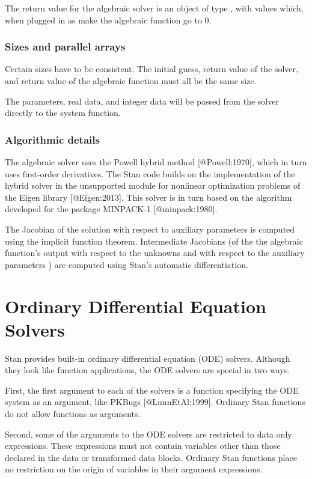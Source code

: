\begin{description}
{\begin{description}
The return value for the algebraic solver is an object of type , with values which, when plugged in as  make the algebraic function go to 0.


\subsubsection{Sizes and parallel arrays}


Certain sizes have to be consistent. The initial guess, return value of the solver, and return value of the algebraic function must all be the same size.


The parameters, real data, and integer data will be passed from the solver directly to the system function.


\subsubsection{Algorithmic details}


The algebraic solver uses the Powell hybrid method [@Powell:1970], which in turn uses first-order derivatives. The Stan code builds on the implementation of the hybrid solver in the unsupported module for nonlinear optimization problems of the Eigen library [@Eigen:2013]. This solver is in turn based on the algorithm developed for the package MINPACK-1 [@minpack:1980].


The Jacobian of the solution with respect to auxiliary parameters is computed using the implicit function theorem. Intermediate Jacobians (of the the algebraic function's output with respect to the unknowns  and with respect to the auxiliary parameters ) are computed using Stan's automatic differentiation.


\section{Ordinary Differential Equation Solvers}\label{functions-ode-solver.section}


Stan provides built-in ordinary differential equation (ODE) solvers. Although they look like function applications, the ODE solvers are special in two ways.


First, the first argument to each of the solvers is a function specifying the ODE system as an argument, like PKBugs [@LunnEtAl:1999]. Ordinary Stan functions do not allow functions as arguments.


Second, some of the arguments to the ODE solvers are restricted to data only expressions. These expressions must not contain variables other than those declared in the data or transformed data blocks. Ordinary Stan functions place no restriction on the origin of variables in their argument expressions.



\end{description}}
\end{description}
